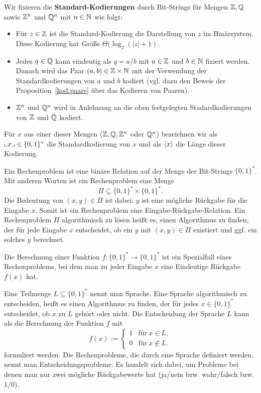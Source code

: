 \begin{defn}
	Wir fixieren die \textbf{Standard-Kodierungen} durch Bit-Strings für Mengen $\mathbb{Z}, \mathbb{Q}$ sowie $\mathbb{Z}^n$ und $\mathbb{Q}^n$ mit $n \in \mathbb{N}$ wie folgt: 
	\begin{itemize}
			\item Für $z \in \mathbb{Z}$ ist die Standard-Kodierung die Darstellung von $z$ im Binärsystem. Diese Kodierung hat Größe $\Theta(\log_2 (|z|+1)$. 
			\item Jedes $q \in \mathbb{Q}$ kann eindeutig als $q = a/b$ mit $a \in \mathbb{Z}$ und $b \in \mathbb{N}$ fixiert werden. Danach wird das Paar $(a,b) \in \mathbb{Z} \times \mathbb{N}$ mit der Verwendung der Standardkodierungen von $a$ und $b$ kodiert (vgl. dazu den Beweis der Proposition~\eqref{kod:paare} über das Kodieren von Paaren). 
			\item $\mathbb{Z}^n$ und $\mathbb{Q}^n$ wird in Anlehnung an die oben festgelegten Stadardkodierungen von $\mathbb{Z}$ und $\mathbb{Q}$ kodiert. 
	\end{itemize} 
	Für $x$ aus einer dieser Mengen ($\mathbb{Z},\mathbb{Q}, \mathbb{Z}^n$ oder $\mathbb{Q}^n$) bezeichnen wir als ${\llcorner x\lrcorner} \in \{0,1\}^\ast$ die Standardkodierung von $x$ und als $\langle x \rangle$ die Länge dieser Kodierung. 
\end{defn} 

\begin{defn}
	Ein Rechenproblem ist eine binäre Relation auf der Menge der Bit-Strings $\{0,1\}^\ast$. Mit anderen Worten ist ein Rechenproblem eine Menge 
	\[
		\Pi \subseteq \{0,1\}^\ast \times \{0,1\}^\ast.
	\]
	Die Bedeutung von $(x,y) \in \Pi$ ist dabei: $y$ ist eine mögliche Rückgabe für die Eingabe $x$. Somit ist ein Rechenproblem eine Eingabe-Rückgabe-Relation. Ein Rechenproblem $\Pi$ algorithmisch zu lösen heißt es, einen Algorithmus zu finden, der für jede Eingabe $x$ entscheidet, ob ein $y$ mit $(x,y) \in \Pi$ existiert und ggf. ein solches $y$ berechnet. 
\end{defn} 

\begin{defn}
	Die Berechnung einer Funktion $f : \{0,1\}^\ast \to \{0,1\}^\ast$ ist ein Spezialfall eines Rechenproblems, bei dem man zu jeder Eingabe $x$ eine Eindeutige Rückgabe $f(x)$ hat. 
\end{defn} 

\begin{defn}
	Eine Teilmenge $L \subseteq \{0,1\}^\ast$ nennt man Sprache. Eine Sprache algorithmisch zu entscheiden, heißt es einen Algorithmus zu finden, der für jedes $x \in \{0,1\}^\ast$ entscheidet, ob $x$ zu $L$ gehört oder nicht. Die Entscheidung der Sprache $L$ kann als die Berechnung der Funktion $f $ mit 
	\[
		f(x) := \begin{cases}
				1 & \text{für} \ x \in L, 
				\\ 0 & \text{für} \ x \not\in L.
			\end{cases} 
	\]
	formuliert werden. Die Rechenprobleme, die durch eine Sprache definiert werden, nennt man Entscheidungsprobleme. Es handelt sich dabei, um Probleme bei denen man nur zwei mögliche Rückgabewerte hat (ja/nein bzw. wahr/falsch bzw. 1/0). 
\end{defn}

